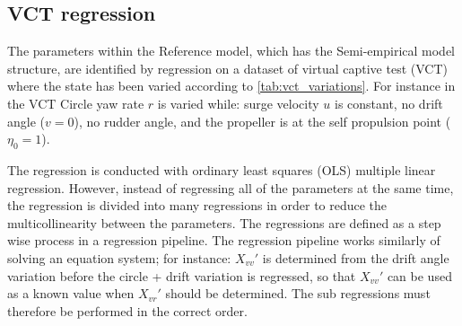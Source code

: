 \subsection{VCT regression}
\label{sec:VCT_regression}
The parameters within the Reference model, which has the Semi-empirical model structure, are identified by regression on a dataset of virtual captive test (VCT) where the state has been varied according to \autoref{tab:vct_variations}. For instance in the VCT Circle yaw rate $r$ is varied while: surge velocity $u$ is constant, no drift angle ($v=0$), no rudder angle, and the propeller is at the self propulsion point ($\eta_0=1$).

The regression is conducted with ordinary least squares (OLS) multiple linear regression. However, instead of regressing all of the parameters at the same time, the regression is divided into many regressions in order to reduce the multicollinearity between the parameters. The regressions are defined as a step wise process in a regression pipeline. 
The regression pipeline works similarly of solving an equation system; for instance: ${X_{vv}}'$ is determined from the drift angle variation before the circle + drift variation is regressed, so that ${X_{vv}}'$ can be used as a known value when ${X_{vr}}'$ should be determined. The sub regressions must therefore be performed in the correct order. 

